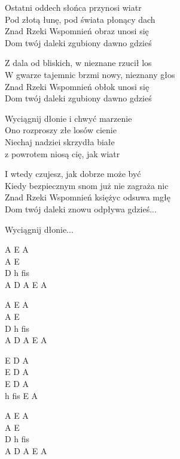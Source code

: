 \begin{text}
    Ostatni oddech słońca przynosi wiatr\\
    Pod złotą łunę, pod świata płonący dach\\
    Znad Rzeki Wspomnień obraz unosi się\\
    Dom twój daleki zgubiony dawno gdzieś

    Z dala od bliskich, w nieznane rzucił los\\
    W gwarze tajemnic brzmi nowy, nieznany głos\\
    Znad Rzeki Wspomnień obłok unosi się\\
    Dom twój daleki zgubiony dawno gdzieś

    \vin Wyciągnij dłonie i chwyć marzenie\\
    \vin Ono rozproszy złe losów cienie\\
    \vin Niechaj nadziei skrzydła białe\\
    \vin z powrotem niosą cię, jak wiatr

    I wtedy czujesz, jak dobrze może być\\
    Kiedy bezpiecznym snom już nie zagraża nic\\
    Znad Rzeki Wspomnień księżyc odsuwa mgłę\\
    Dom twój daleki znowu odpływa gdzieś...
	
	\vin Wyciągnij dłonie...

\end{text}
\begin{chord}
    A E A\\
    A E\\
    D h fis\\
    A D A E A
 
    A E A\\
    A E\\
    D h fis\\
    A D A E A

    E D A\\
    E D A\\
    E D A\\
    h fis E A
	
	A E A\\
    A E\\
    D h fis\\
    A D A E A
\end{chord}